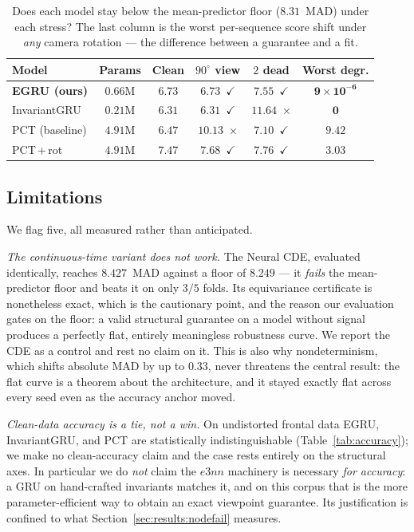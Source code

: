\begin{table}[!t]
\centering
\caption{Does each model stay below the mean-predictor floor ($8.31$~MAD) under each stress? The last
column is the worst per-sequence score shift under \emph{any} camera rotation --- the difference
between a guarantee and a fit.}
\label{tab:pareto}
\scriptsize
\setlength{\tabcolsep}{4pt}
\begin{tabular}{lccccc}
\toprule
Model & Params & Clean & $90^\circ$ view & $2$ dead & Worst degr. \\
\midrule
\textbf{EGRU (ours)} & $0.66$M & $6.73$ & $6.73$~$\checkmark$ & $7.55$~$\checkmark$ & $\mathbf{9\!\times\!10^{-6}}$ \\
InvariantGRU   & $0.21$M & $6.31$ & $6.31$~$\checkmark$ & $11.64$~$\times$ & $\mathbf{0}$ \\
PCT (baseline) & $4.91$M & $6.47$ & $10.13$~$\times$ & $7.10$~$\checkmark$ & $9.42$ \\
PCT\,+\,rot    & $4.91$M & $7.47$ & $7.68$~$\checkmark$ & $7.76$~$\checkmark$ & $3.03$ \\
\bottomrule
\end{tabular}
\end{table}

\subsection{Limitations}
\label{sec:results:limits}

We flag five, all measured rather than anticipated.

\emph{The continuous-time variant does not work.} The Neural CDE, evaluated identically, reaches
$8.427$~MAD against a floor of $8.249$ --- it \emph{fails} the mean-predictor floor and beats it on
only $3/5$ folds. Its equivariance certificate is nonetheless exact, which is the cautionary point,
and the reason our evaluation gates on the floor: a valid structural guarantee on a model without
signal produces a perfectly flat, entirely meaningless robustness curve. We report the CDE as a
control and rest no claim on it. This is also why nondeterminism, which shifts absolute MAD by up to
$0.33$, never threatens the central result: the flat curve is a theorem about the architecture, and
it stayed exactly flat across every seed even as the accuracy anchor moved.

\emph{Clean-data accuracy is a tie, not a win.} On undistorted frontal data EGRU, InvariantGRU, and
PCT are statistically indistinguishable (Table~\ref{tab:accuracy}); we make no clean-accuracy claim
and the case rests entirely on the structural axes. In particular we do \emph{not} claim the $e3nn$
machinery is necessary \emph{for accuracy}: a GRU on hand-crafted invariants matches it, and on this
corpus that is the more parameter-efficient way to obtain an exact viewpoint guarantee. Its
justification is confined to what Section~\ref{sec:results:nodefail} measures.


